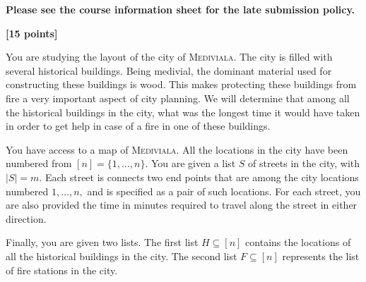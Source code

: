 \documentclass{assignment-373}
\begin{document}
\think

\textbf{Please see the course information sheet for the late submission
  policy.}

\textbf{[15 points]}

You are studying the layout of the city of \textsc{Mediviala}. The city is
filled with several historical buildings. Being medivial, the dominant
material used for constructing these buildings is wood. This makes
protecting these buildings from fire a very important aspect of city
planning. We will determine that among all the historical buildings in
the city, what was the longest time it would have taken in order to
get help in case of a fire in one of these buildings.

You have access to a map of \textsc{Mediviala}. All the locations in
the city have been numbered from $[n] = \{1,\ldots, n\}.$
%
You are given a list $S$ of streets in the city, with $|S| = m$. Each
street is connects two end points that are among the city locations
numbered $1, \ldots, n,$ and is specified as a pair of such locations.
%
For each street, you are also provided the time in minutes required to
travel along the street in either direction.


Finally, you are given two lists. The first list $H \subseteq [n]$
contains the locations of all the historical buildings in the city.
%
The second list $F \subseteq [n]$ represents the list of fire stations
in the city.
\end{document}
